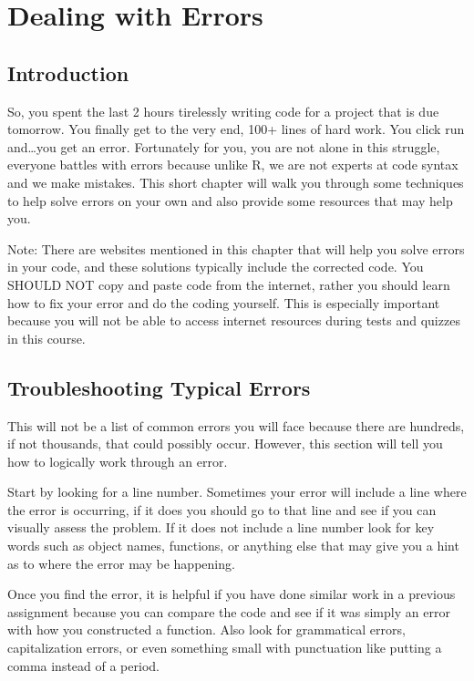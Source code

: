 \documentclass[
]{book}
\begin{document}
\hypertarget{dealing-with-errors}{%
\chapter{Dealing with Errors}\label{dealing-with-errors}}

\hypertarget{introduction-3}{%
\section{Introduction}\label{introduction-3}}

So, you spent the last 2 hours tirelessly writing code for a project that is due tomorrow. You finally get to the very end, 100+ lines of hard work. You click run and\ldots you get an error. Fortunately for you, you are not alone in this struggle, everyone battles with errors because unlike R, we are not experts at code syntax and we make mistakes. This short chapter will walk you through some techniques to help solve errors on your own and also provide some resources that may help you.

Note: There are websites mentioned in this chapter that will help you solve errors in your code, and these solutions typically include the corrected code. You SHOULD NOT copy and paste code from the internet, rather you should learn how to fix your error and do the coding yourself. This is especially important because you will not be able to access internet resources during tests and quizzes in this course.

\hypertarget{troubleshooting-typical-errors}{%
\section{Troubleshooting Typical Errors}\label{troubleshooting-typical-errors}}

This will not be a list of common errors you will face because there are hundreds, if not thousands, that could possibly occur. However, this section will tell you how to logically work through an error.

Start by looking for a line number. Sometimes your error will include a line where the error is occurring, if it does you should go to that line and see if you can visually assess the problem. If it does not include a line number look for key words such as object names, functions, or anything else that may give you a hint as to where the error may be happening.

Once you find the error, it is helpful if you have done similar work in a previous assignment because you can compare the code and see if it was simply an error with how you constructed a function. Also look for grammatical errors, capitalization errors, or even something small with punctuation like putting a comma instead of a period.
\end{document}
